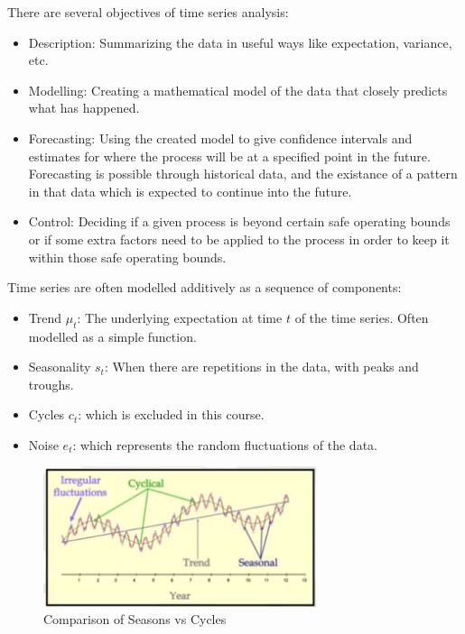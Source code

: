 \documentclass[12pt]{article}
\begin{document}
    There are several objectives of time series analysis:
    \begin{itemize} 
        \item Description: Summarizing the data in useful ways like expectation, variance, etc.
        \item Modelling: Creating a mathematical model of the data that closely predicts what has happened.
        \item Forecasting: Using the created model to give confidence intervals and estimates for where the process will be at a specified point in the future.  Forecasting is possible through historical data, and the existance of a pattern in that data which is expected to continue into the future.
        \item Control: Deciding if a given process is beyond certain safe operating bounds or if some extra factors need to be applied to the process in order to keep it within those safe operating bounds.
    \end{itemize} 

    Time series are often modelled additively as a sequence of components: 
    \begin{itemize} 
        \item Trend \(\mu_t\): The underlying expectation at time \(t\) of the time series. Often modelled as a simple function.
        \item Seasonality \(s_t\): When there are repetitions in the data, with peaks and troughs.
        \item Cycles \(c_t\): which is excluded in this course.
        \item Noise \(e_t\): which represents the random fluctuations of the data.
    \end{itemize} 
    \begin{figure}[t]
        \centering
        \includegraphics[width=8cm]{cycles_vs_seasons}
        \caption{Comparison of Seasons vs Cycles}
    \end{figure}
\end{document}

